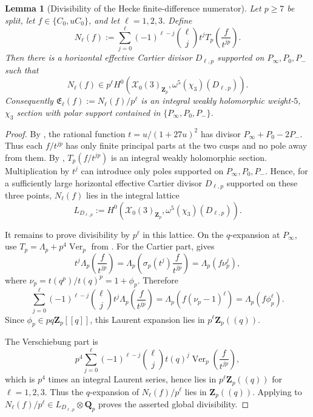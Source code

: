 \documentclass[11pt]{amsart}
\newtheorem{lemma}[theorem]{Lemma}
\theoremstyle{definition}
\theoremstyle{remark}
\newcommand{\Q}{\mathbf{Q}}
\newcommand{\Z}{\mathbf{Z}}
\begin{document}
\begin{lemma}[Divisibility of the Hecke finite-difference numerator]\label{lem:divisibility-Nell}
Let $p\ge 7$ be split, let $f\in\{C_0,uC_0\}$, and let $\ell=1,2,3$. Define
\[
N_\ell(f):=\sum_{j=0}^{\ell}(-1)^{\ell-j}\binom{\ell}{j}t^jT_p\!\left(\frac{f}{t^{jp}}\right).
\]
Then there is a horizontal effective Cartier divisor $D_{\ell,p}$ supported on $P_\infty,P_0,P_-$ such that
\[
N_\ell(f)\in p^\ell H^0(\mathcal X_0(3)_{\Z_p},\omega^5(\chi_3)(D_{\ell,p})).
\]
Consequently $\mathfrak E_\ell(f):=N_\ell(f)/p^\ell$ is an integral weakly holomorphic weight-$5$, $\chi_3$ section with polar support contained in $\{P_\infty,P_0,P_-\}$.
\end{lemma}

\begin{proof}
By , the rational function $t=u/(1+27u)^2$ has divisor $P_\infty+P_0-2P_-$. Thus each $f/t^{jp}$ has only finite principal parts at the two cusps and no pole away from them. By , $T_p(f/t^{jp})$ is an integral weakly holomorphic section. Multiplication by $t^j$ can introduce only poles supported on $P_\infty,P_0,P_-$. Hence, for a sufficiently large horizontal effective Cartier divisor $D_{\ell,p}$ supported on these three points, $N_\ell(f)$ lies in the integral lattice
\[
L_{D_{\ell,p}}:=H^0(\mathcal X_0(3)_{\Z_p},\omega^5(\chi_3)(D_{\ell,p})).
\]

It remains to prove divisibility by $p^\ell$ in this lattice. On the $q$-expansion at $P_\infty$, use $T_p=\Lambda_p+p^4\operatorname{Ver}_p$ from . For the Cartier part,  gives
\[
t^j\Lambda_p\!\left(\frac{f}{t^{jp}}\right)
=\Lambda_p\!\left(\sigma_p(t^j)\frac{f}{t^{jp}}\right)
=\Lambda_p(f\nu_p^j),
\]
where $\nu_p=t(q^p)/t(q)^p=1+\phi_p$. Therefore
\[
\sum_{j=0}^{\ell}(-1)^{\ell-j}\binom{\ell}{j}
t^j\Lambda_p\!\left(\frac{f}{t^{jp}}\right)
=\Lambda_p(f(\nu_p-1)^\ell)=\Lambda_p(f\phi_p^\ell).
\]
Since $\phi_p\in pq\Z_p[[q]]$, this Laurent expansion lies in $p^\ell\Z_p((q))$.

The Verschiebung part is
\[
p^4\sum_{j=0}^{\ell}(-1)^{\ell-j}\binom{\ell}{j}t(q)^j\operatorname{Ver}_p\!\left(\frac{f}{t^{jp}}\right),
\]
which is $p^4$ times an integral Laurent series, hence lies in $p^\ell\Z_p((q))$ for $\ell=1,2,3$. Thus the $q$-expansion of $N_\ell(f)/p^\ell$ lies in $\Z_p((q))$. Applying  to $N_\ell(f)/p^\ell\in L_{D_{\ell,p}}\otimes\Q_p$ proves the asserted global divisibility.
\end{proof}
\end{document}
